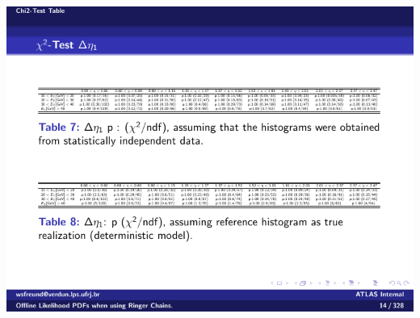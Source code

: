 \begin{table}[p]
\begin{subtable}{\textwidth}
\includegraphics[width=\textwidth]{appendices/figures/gof/deltaeta_chi2_table.pdf}
\end{subtable} \\
\end{table}%
